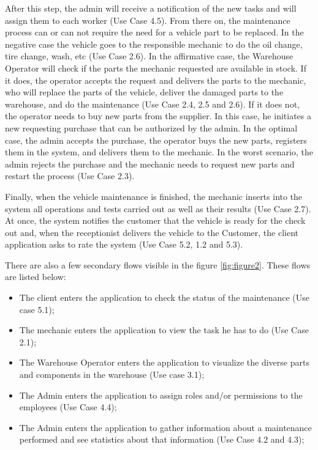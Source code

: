 After this step, the admin will receive a notification of the new tasks and will assign them to each worker (Use Case 4.5).
From there on, the maintenance process can or can not require the need for a vehicle part to be replaced. 
In the negative case the vehicle goes to the responsible mechanic to do the oil change, tire change, wash, etc (Use Case 2.6). 
In the affirmative case, the Warehouse Operator will check if the parts the mechanic requested are available in stock. 
If it does, the operator accepts the request and delivers the parts to the mechanic, who will replace the parts of the vehicle, deliver the damaged parts to the warehouse, and do the maintenance (Use Case 2.4, 2.5 and 2.6). 
If it does not, the operator needs to buy new parts from the supplier. 
In this case, he initiates a new requesting purchase that can be authorized by the admin. 
In the optimal case, the admin accepts the purchase, the operator buys the new parts, registers them in the system, and delivers them to the mechanic. 
In the worst scenario, the admin rejects the purchase and the mechanic needs to request new parts and restart the process (Use Case 2.3).    

Finally, when the vehicle maintenance is finished, the mechanic inserts into the system all operations and tests carried out as well as their results (Use Case 2.7). 
At once, the system notifies the customer that the vehicle is ready for the check out and, when the receptionist delivers the vehicle to the Customer, the client application asks to rate the system (Use Case 5.2, 1.2 and 5.3).

There are also a few secondary flows visible in the figure \ref{fig:figure2}. 
These flows are listed below:
\begin{itemize}
  \item The client enters the application to check the status of the maintenance (Use case 5.1);
  \item The mechanic enters the application to view the task he has to do (Use Case 2.1); 
  \item The Warehouse Operator enters the application to visualize the diverse parts and components in the warehouse (Use case 3.1); 
  \item The Admin enters the application to assign roles and/or permissions to the employees (Use Case 4.4); 
  \item The Admin enters the application to gather information about a maintenance performed and see statistics about that information (Use Case 4.2 and 4.3); 
\end{itemize}
 








